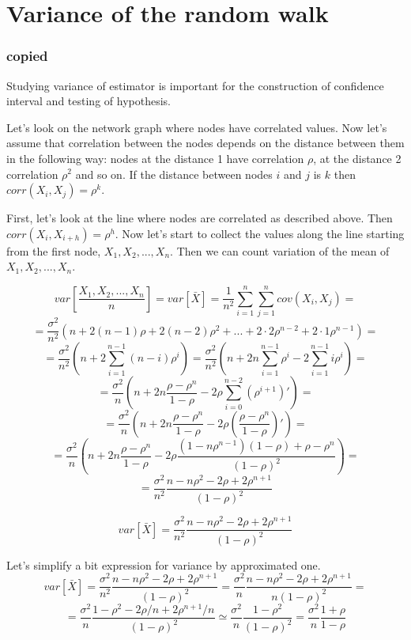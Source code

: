 \documentclass[12pt]{report}
\begin{document}
\chapter{Variance of the random walk}
\subsection{copied}
Studying variance of estimator is important for the construction of confidence interval and testing of hypothesis.


Let's look on the network graph where nodes have correlated values. Now let's assume that correlation between the nodes depends on the distance between them in the following way: nodes at the distance 1 have correlation $\rho$, at the distance 2 correlation $\rho^2$ and so on.
If the distance between nodes $i$ and $j$ is $k$ then $corr(X_i, X_j) = \rho^k$.

First, let's look at the line where nodes are correlated as described above. Then $corr(X_i, X_{i+h}) = \rho^h$. Now let's start to collect the values along the line starting from the first node, $X_1, X_2, ..., X_n$. Then we can count variation of the mean of $X_1, X_2, ..., X_n$.

$$var\left[ \frac{X_1, X_2, ..., X_n}{n} \right] = var\left[\bar{X} \right] = \frac{1}{n^2} \sum_{i=1}^{n}\sum_{j=1}^{n} cov(X_i, X_j) =$$ 
$$ = \frac{\sigma^2}{n^2} \left( n + 2(n-1)\rho + 2(n-2)\rho^2 + ... + 2\cdot2 \rho^{n-2}+ 2\cdot1 \rho^{n-1} \right) = $$
$$ = \frac{\sigma^2}{n^2} \left(n + 2\sum_{i=1}^{n-1} (n-i)\rho^i \right) = \frac{\sigma^2}{n^2} \left(n + 2n\sum_{i=1}^{n-1}\rho^i - 2\sum_{i=1}^{n-1}i\rho^i \right) = $$
$$ = \frac{\sigma^2}{n} \left(n + 2n\frac{\rho-\rho^{n}}{1-\rho} - 2\rho \sum_{i=0}^{n-2} (\rho^{i+1})' \right) = $$
$$ = \frac{\sigma^2}{n} \left(n + 2n\frac{\rho-\rho^{n}}{1-\rho} - 2\rho\left(\frac{\rho-\rho^n}{1-\rho}\right)' \right) = $$
$$ = \frac{\sigma^2}{n} \left(n + 2n\frac{\rho-\rho^{n}}{1-\rho} - 2\rho \frac{(1-n\rho^{n-1})(1-\rho) + \rho - \rho^n}{(1-\rho)^2} \right) = $$
$$ = \frac{\sigma^2}{n^2} \frac{n-n\rho^2 - 2\rho + 2\rho^{n+1}}{(1-\rho)^2}$$


$$ var\left[\bar{X} \right] = \frac{\sigma^2}{n^2} \frac{n-n\rho^2 - 2\rho + 2\rho^{n+1}}{(1-\rho)^2}$$



Let's simplify a bit expression for variance by approximated one.
$$var\left[\bar{X} \right] = \frac{\sigma^2}{n^2} \frac{n-n\rho^2 - 2\rho + 2\rho^{n+1}}{(1-\rho)^2} = \frac{\sigma^2}{n} \frac{n-n\rho^2 - 2\rho + 2\rho^{n+1}}{n(1-\rho)^2} = $$
$$= \frac{\sigma^2}{n} \frac{1-\rho^2 - 2\rho/n + 2\rho^{n+1}/n}{(1-\rho)^2} \simeq \frac{\sigma^2}{n} \frac{1-\rho^2}{(1-\rho)^2} = \frac{\sigma^2}{n} \frac{1+\rho}{1-\rho}$$
\end{document}
